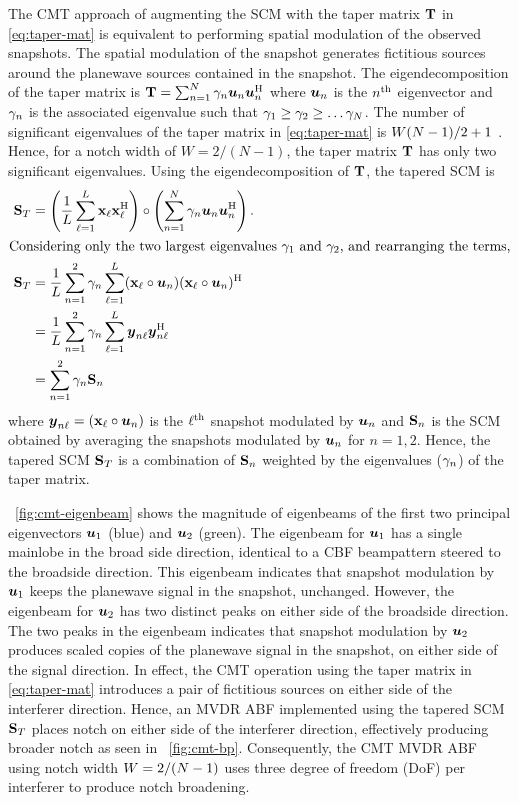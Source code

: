 The CMT approach of augmenting the SCM with the taper matrix
$\mathbf{T}$ in \eqref{eq:taper-mat} is equivalent to performing
spatial modulation of the observed snapshots. The spatial modulation
of the snapshot generates fictitious sources around the planewave
sources contained in the snapshot. The eigendecomposition of the taper
matrix is
$\mathbf{T} = \sum_{n=1}^{N}\gamma_n\boldsymbol{u}_n\boldsymbol{u}_n^{\rm H}$ where
$\boldsymbol{u}_n$ is the $n^{\rm th}$ eigenvector and $\gamma_n$ is the
associated eigenvalue such that
$\gamma_1 \geq \gamma_2 \geq \ldots \gamma_N$. The number of significant
eigenvalues of the taper matrix in \eqref{eq:taper-mat} is
$W(N-1)/2 + 1$ \cite{song2003null}. Hence, for a notch width of
$W = 2/(N-1)$, the taper matrix $\mathbf{T}$ has only two significant
eigenvalues. Using the eigendecomposition of $\mathbf{T}$, the tapered
SCM is
\begin{align*}
  {\bf S}_{T} &= \left( \frac{1}{L}\sum\limits_{\ell = 1}^{L}{\bf x}_{\ell}{\bf x}_{\ell}^{\rm H} \right) \circ \left( \sum\limits_{n=1}^{N}\gamma_n\boldsymbol{u}_n\boldsymbol{u}_n^{\rm H} \right).\\
  \intertext{Considering only the two largest eigenvalues $\gamma_1$ and $\gamma_2$, and rearranging the terms,}
  \
   {\bf S}_{T} &= \frac{1}{L}\sum\limits_{n=1}^{2}\gamma_n\sum\limits_{\ell = 1}^{L}({\bf x}_{\ell}\circ\boldsymbol{u}_n)({\bf x}_{\ell}\circ\boldsymbol{u}_n)^{\rm H}\\
               &= \frac{1}{L}\sum\limits_{n=1}^{2}\gamma_n\sum\limits_{\ell = 1}^{L}\boldsymbol{y}_{n\ell}\boldsymbol{y}_{n\ell}^{\rm H} \\
               &= \sum\limits_{n=1}^{2}\gamma_n{\bf S}_n
\end{align*}
where $\boldsymbol{y}_{n\ell} = ({\bf x}_{\ell}\circ\boldsymbol{u}_n)$ is the
$\ell^{\rm th}$ snapshot modulated by $\boldsymbol{u}_n$ and
${\bf S}_n$ is the SCM obtained by averaging the snapshots modulated
by $\boldsymbol{u}_n$ for $n = 1, 2$. Hence, the tapered SCM
${\bf S}_{T}$ is a combination of ${\bf S}_n$ weighted
by the eigenvalues ($\gamma_n$) of the taper matrix.

\figurename{}~\ref{fig:cmt-eigenbeam} shows the magnitude of
eigenbeams of the first two principal eigenvectors $\boldsymbol{u}_1$
(blue) and $\boldsymbol{u}_2$ (green). The eigenbeam for $\boldsymbol{u}_1$
has a single mainlobe in the broad side direction, identical to a CBF
beampattern steered to the broadside direction. This eigenbeam
indicates that snapshot modulation by $\boldsymbol{u}_1$ keeps the
planewave signal in the snapshot, unchanged. However, the eigenbeam
for $\boldsymbol{u}_2$ has two distinct peaks on either side of the
broadside direction. The two peaks in the eigenbeam indicates that
snapshot modulation by $\boldsymbol{u}_2$ produces scaled copies of the
planewave signal in the snapshot, on either side of the signal
direction. In effect, the CMT operation using the taper matrix in
\eqref{eq:taper-mat} introduces a pair of fictitious sources on either
side of the interferer direction. Hence, an MVDR ABF implemented using
the tapered SCM ${\bf S}_{T}$ places notch on either side of the
interferer direction, effectively producing broader notch as seen in
\figurename{}~\ref{fig:cmt-bp}. Consequently, the CMT MVDR ABF using
notch width $W = 2/(N-1)$ uses three degree of freedom (DoF) per
interferer to produce notch broadening.

